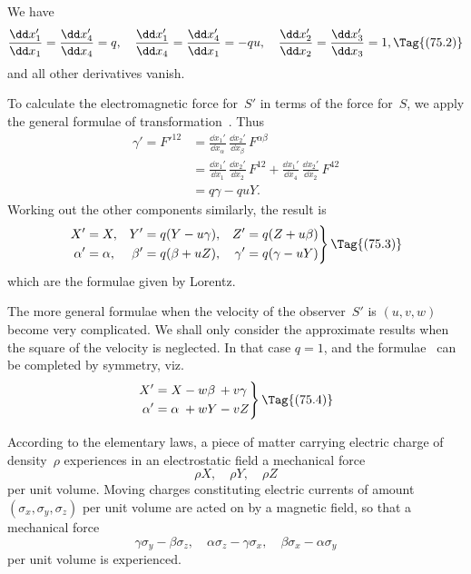\documentclass[12pt]{book}
\begin{document}
We have
\[
\frac{\dd x_{1}'}{\dd x_{1}} = \frac{\dd x_{4}'}{\dd x_{4}} = q,\quad
\frac{\dd x_{1}'}{\dd x_{4}} = \frac{\dd x_{4}'}{\dd x_{1}} = -qu,\quad
\frac{\dd x_{2}'}{\dd x_{2}} = \frac{\dd x_{3}'}{\dd x_{3}} = 1,
\Tag{(75.2)}
\]
and all other derivatives vanish.

To calculate the electromagnetic force for~$S'$ in terms of the force for~$S$,
we apply the general formulae of transformation~. Thus
\begin{align*}
  \gamma' = F'^{12}
  &= \frac{\dd x_{1}'}{\dd x_{\alpha}}\, \frac{\dd x_{2}'}{\dd x_{\beta}}\, F^{\alpha\beta} \\
  &= \frac{\dd x_{1}'}{\dd x_{1}}\, \frac{\dd x_{2}'}{\dd x_{2}}\, F^{12}
   + \frac{\dd x_{1}'}{\dd x_{4}}\, \frac{\dd x_{2}'}{\dd x_{2}}\, F^{42} \\
  &= q\gamma - quY.
\end{align*}
Working out the other components similarly, the result is
\[
\left.
\begin{aligned}
  X' &= X, & Y' &= q(Y - u\gamma), & Z' &= q(Z + u\beta)\\
  \alpha' &= \alpha, & \beta' &= q(\beta + uZ), & \gamma' &= q(\gamma - uY)
\end{aligned}
\right\}
\Tag{(75.3)}
\]
which are the formulae given by Lorentz.

The more general formulae when the velocity of the observer~$S'$ is $(u, v, w)$
become very complicated. We shall only consider the approximate results
when the square of the velocity is neglected. In that case $q = 1$, and the
formulae~ can be completed by symmetry, viz.\
\[
\left.
\begin{alignedat}{3}
  X' &= X &&- w\beta &&+ v\gamma\\
  \alpha' &= \alpha &&+ wY &&- vZ
\end{alignedat}
\right\}
\Tag{(75.4)}
\]


According to the elementary laws, a piece of matter carrying electric
charge of density~$\rho$ experiences in an electrostatic field a mechanical force
\[
\rho X,\quad \rho Y,\quad \rho Z
\]
per unit volume. Moving charges constituting electric currents of amount
$(\sigma_{x}, \sigma_{y}, \sigma_{z})$ per unit volume are acted on by a magnetic field, so that a
mechanical force
\[
\gamma\sigma_{y} - \beta\sigma_{z},\quad
\alpha\sigma_{z} - \gamma\sigma_{x},\quad
\beta\sigma_{x} - \alpha\sigma_{y}
\]
per unit volume is experienced.
\end{document}
